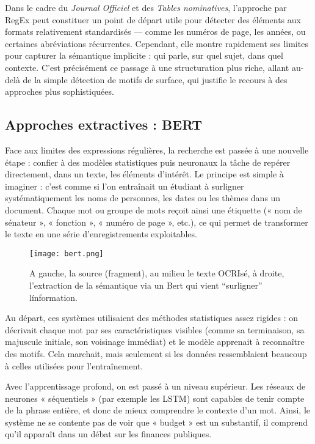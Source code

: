 Dans le cadre du \emph{Journal Officiel} et des \emph{Tables nominatives}, l’approche par RegEx peut constituer un point de départ utile pour détecter des éléments aux formats relativement standardisés — comme les numéros de page, les années, ou certaines abréviations récurrentes. Cependant, elle montre rapidement ses limites pour capturer la sémantique implicite : qui parle, sur quel sujet, dans quel contexte. C’est précisément ce passage à une structuration plus riche, allant au-delà de la simple détection de motifs de surface, qui justifie le recours à des approches plus sophistiquées. 

\subsection{Approches extractives : BERT}

Face aux limites des expressions régulières, la recherche est passée à une nouvelle étape : confier à des modèles statistiques puis neuronaux la tâche de repérer directement, dans un texte, les éléments d’intérêt. Le principe est simple à imaginer : c’est comme si l’on entraînait un étudiant à surligner systématiquement les noms de personnes, les dates ou les thèmes dans un document. Chaque mot ou groupe de mots reçoit ainsi une étiquette (« nom de sénateur », « fonction », « numéro de page », etc.), ce qui permet de transformer le texte en une série d’enregistrements exploitables.

\begin{figure}[htbp]
\centering
\texttt{[image: bert.png]}
\caption{A gauche, la source (fragment), au milieu le texte OCRIsé, à droite, l'extraction de la sémantique via un Bert qui vient \enquote{surligner} l\'information.}
\label{fig:bert}
\end{figure}

Au départ, ces systèmes utilisaient des méthodes statistiques assez rigides : on décrivait chaque mot par ses caractéristiques visibles (comme sa terminaison, sa majuscule initiale, son voisinage immédiat) et le modèle apprenait à reconnaître des motifs. Cela marchait, mais seulement si les données ressemblaient beaucoup à celles utilisées pour l’entraînement.

Avec l’apprentissage profond, on est passé à un niveau supérieur. Les réseaux de neurones « séquentiels » (par exemple les LSTM) sont capables de tenir compte de la phrase entière, et donc de mieux comprendre le contexte d’un mot. Ainsi, le système ne se contente pas de voir que « budget » est un substantif, il comprend qu’il apparaît dans un débat sur les finances publiques.

